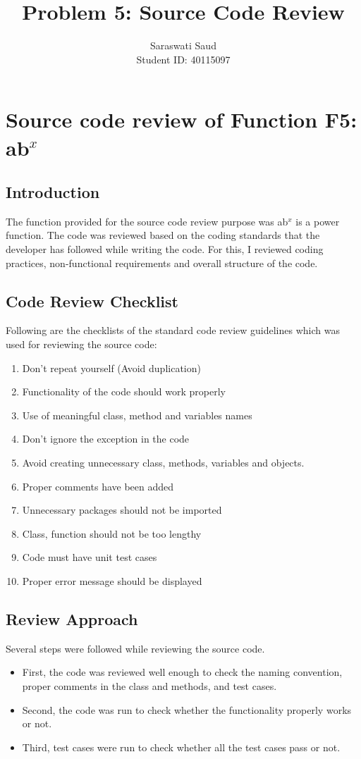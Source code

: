 \documentclass[a4paper,12pt]{article}
\title{Problem 5: Source Code Review}
\author{Saraswati Saud \\
Student ID: 40115097}
\date{}
\begin{document}
\maketitle
\section{Source code review of Function F5: ab$^x$}
    \subsection{Introduction}
    The function provided for the source code review purpose was ab$^x$ is a power function. The code was reviewed based on the coding standards that the developer has followed while writing the code. For this, I reviewed coding practices, non-functional requirements and overall structure of the code.
    
    \subsection{Code Review Checklist}
    Following are the checklists of the standard code review guidelines which was used for reviewing the source code:
    \begin{enumerate}
        \item Don’t repeat yourself (Avoid duplication)
        \item Functionality of the code should work properly
        \item Use of meaningful class, method and variables names
        \item Don’t ignore the exception in the code
        \item Avoid creating unnecessary class, methods, variables and objects.
        \item Proper comments have been added
        \item Unnecessary packages should not be imported
        \item Class, function should not be too lengthy
        \item Code must have unit test cases
        \item Proper error message should be displayed
    \end{enumerate}
    
    \subsection{Review Approach}
    Several steps were followed while reviewing the source code.
    \begin{itemize}
        \item First, the code was reviewed well enough to check the naming convention, proper comments in the class and methods, and test cases.
        \item Second, the code was run to check whether the functionality properly works or not.
        \item Third, test cases were run to check whether all the test cases pass or not.
    \end{itemize}
    
\end{document}
